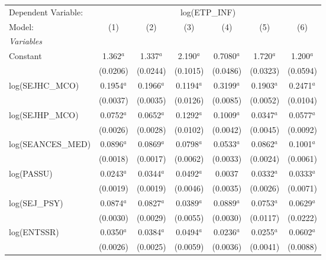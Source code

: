 
\begingroup
\centering
\begin{tabular}{lcccccc}
   \tabularnewline \midrule \midrule
   Dependent Variable: & \multicolumn{6}{c}{log(ETP\_INF)}\\
   Model:              & (1)          & (2)          & (3)          & (4)          & (5)          & (6)\\  
   \midrule
   \emph{Variables}\\
   Constant            & 1.362$^{a}$  & 1.337$^{a}$  & 2.190$^{a}$  & 0.7080$^{a}$ & 1.720$^{a}$  & 1.200$^{a}$\\   
                       & (0.0206)     & (0.0244)     & (0.1015)     & (0.0486)     & (0.0323)     & (0.0594)\\   
   log(SEJHC\_MCO)     & 0.1954$^{a}$ & 0.1966$^{a}$ & 0.1194$^{a}$ & 0.3199$^{a}$ & 0.1903$^{a}$ & 0.2471$^{a}$\\   
                       & (0.0037)     & (0.0035)     & (0.0126)     & (0.0085)     & (0.0052)     & (0.0104)\\   
   log(SEJHP\_MCO)     & 0.0752$^{a}$ & 0.0652$^{a}$ & 0.1292$^{a}$ & 0.1009$^{a}$ & 0.0347$^{a}$ & 0.0577$^{a}$\\   
                       & (0.0026)     & (0.0028)     & (0.0102)     & (0.0042)     & (0.0045)     & (0.0092)\\   
   log(SEANCES\_MED)   & 0.0896$^{a}$ & 0.0869$^{a}$ & 0.0798$^{a}$ & 0.0533$^{a}$ & 0.0862$^{a}$ & 0.1001$^{a}$\\   
                       & (0.0018)     & (0.0017)     & (0.0062)     & (0.0033)     & (0.0024)     & (0.0061)\\   
   log(PASSU)          & 0.0243$^{a}$ & 0.0344$^{a}$ & 0.0492$^{a}$ & 0.0037       & 0.0332$^{a}$ & 0.0333$^{a}$\\   
                       & (0.0019)     & (0.0019)     & (0.0046)     & (0.0035)     & (0.0026)     & (0.0071)\\   
   log(SEJ\_PSY)       & 0.0874$^{a}$ & 0.0827$^{a}$ & 0.0389$^{a}$ & 0.0889$^{a}$ & 0.0753$^{a}$ & 0.0629$^{a}$\\   
                       & (0.0030)     & (0.0029)     & (0.0055)     & (0.0030)     & (0.0117)     & (0.0222)\\   
   log(ENTSSR)         & 0.0350$^{a}$ & 0.0384$^{a}$ & 0.0494$^{a}$ & 0.0236$^{a}$ & 0.0255$^{a}$ & 0.0602$^{a}$\\   
                       & (0.0026)     & (0.0025)     & (0.0059)     & (0.0036)     & (0.0041)     & (0.0088)\\   

\end{tabular}
